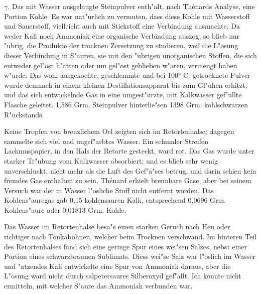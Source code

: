 \documentclass[a4paper, 11pt, oneside]{article}
\begin{document}
$\gamma$. Das mit Wasser ausgelaugte Steinpulver enth"alt, nach Thénards Analyse, eine Portion Kohle. Es war nat"urlich zu vermuten, dass diese Kohle mit Wasserstoff und Sauerstoff, vielleicht auch mit Stickstoff eine Verbindung ausmachte. Da weder Kali noch Ammoniak eine organische Verbindung auszog, so blieb nur "ubrig, die Produkte der trocknen Zersetzung zu studieren, weil die L"osung dieser Verbindung in S"auren, sie mit den "ubrigen unorganischen Stoffen, die sich entweder gel"ost h"atten oder um gel"ost geblieben w"aren, vermengt haben w"urde. Das wohl ausgekochte, geschlemmte und bei 100° C. getrocknete Pulver wurde demnach in einem kleinen Destillationsapparat bis zum Gl"uhen erhitzt, und das sich entwickelnde Gas in eine umgest"urzte, mit Kalkwasser gef"ullte Flasche geleitet. 1,586 Grm, Steinpulver hinterlie"sen 1398 Grm. kohlschwarzen R"uckstands.

Keine Tropfen von brenzlichem Oel zeigten sich im Retortenhalse; dagegen sammelte sich viel und ungef"arbtes Wasser. Ein schmaler Streifen Lackmuspapier, in den Hals der Retorte gesteckt, ward rot. Das Gas wurde unter starker Tr"ubung vom Kalkwasser absorbiert; und es blieb sehr wenig unverschluckt, nicht mehr als die Luft des Gef"a"ses betrug, und darin schien kein fremdes Gas enthalten zu sein. Thénard erhielt brennbare Gase, aber bei seinem Versuch war der in Wasser l"osliche Stoff nicht entfernt worden. Das Kohlens"auregas gab 0,15 kohlensauren Kalk, entsprechend 0,0696 Grm. Kohlens"aure oder 0,01813 Grm. Kohle.

Das Wasser im Retortenhalse besa"s einen starken Geruch nach Heu oder richtiger nach Tonkabohnen, welcher beim Trocknen verschwand. Im hinteren Teil des Retortenhalses fand sich eine geringe Spur eines wei"sen Salzes, nebst einer Portion eines schwarzbraunen Sublimats. Diess wei"se Salz war l"oslich im Wasser und "atzendes Kali entwickelte eine Spur von Ammoniak daraus, aber die L"osung ward nicht durch salpetersaures Silberoxyd gef"allt. Ich konnte nicht ermitteln, mit welcher S"aure das Ammoniak verbunden war.
\end{document}
